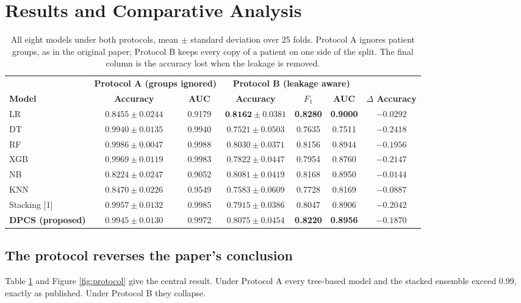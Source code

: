 \documentclass[11pt,a4paper]{article}
\newcommand{\tabhead}[1]{\textbf{#1}}
\newcommand{\best}[1]{\textbf{#1}}
\begin{document}
\section{Results and Comparative Analysis}\label{sec:results2}

\begin{table}[h]\centering\small
\caption{All eight models under both protocols, mean $\pm$ standard deviation
over 25 folds. Protocol A ignores patient groups, as in the original paper;
Protocol B keeps every copy of a patient on one side of the split. The final
column is the accuracy lost when the leakage is removed.}\label{tab:main}
\setlength{\tabcolsep}{4pt}
\begin{tabular}{lcccccc}
\toprule
& \multicolumn{2}{c}{\tabhead{Protocol A (groups ignored)}}
& \multicolumn{3}{c}{\tabhead{Protocol B (leakage aware)}} & \\
\cmidrule(lr){2-3}\cmidrule(lr){4-6}
\tabhead{Model} & \tabhead{Accuracy} & \tabhead{AUC}
& \tabhead{Accuracy} & \tabhead{$F_1$} & \tabhead{AUC}
& \tabhead{$\Delta$ Accuracy}\\
\midrule
LR       & $0.8455\pm0.0244$ & 0.9179 & $\best{0.8162}\pm0.0381$ & \best{0.8280} & \best{0.9000} & $-0.0292$\\
DT       & $0.9940\pm0.0135$ & 0.9940 & $0.7521\pm0.0503$ & 0.7635 & 0.7511 & $-0.2418$\\
RF       & $0.9986\pm0.0047$ & 0.9988 & $0.8030\pm0.0371$ & 0.8156 & 0.8944 & $-0.1956$\\
XGB      & $0.9969\pm0.0119$ & 0.9983 & $0.7822\pm0.0447$ & 0.7954 & 0.8760 & $-0.2147$\\
NB       & $0.8224\pm0.0247$ & 0.9052 & $0.8081\pm0.0419$ & 0.8168 & 0.8950 & $-0.0144$\\
KNN      & $0.8470\pm0.0226$ & 0.9549 & $0.7583\pm0.0609$ & 0.7728 & 0.8169 & $-0.0887$\\
\midrule
Stacking [1] & $0.9957\pm0.0132$ & 0.9985 & $0.7915\pm0.0386$ & 0.8047 & 0.8906 & $-0.2042$\\
\textbf{DPCS (proposed)} & $0.9945\pm0.0130$ & 0.9972 & $\mathbf{0.8075}\pm0.0454$ & \textbf{0.8220} & \textbf{0.8956} & $-0.1870$\\
\bottomrule
\end{tabular}
\end{table}

\subsection{The protocol reverses the paper's conclusion}
Table \ref{tab:main} and Figure \ref{fig:protocol} give the central result. Under
Protocol A every tree-based model and the stacked ensemble exceed 0.99, exactly
as published. Under Protocol B they collapse.
\end{document}
